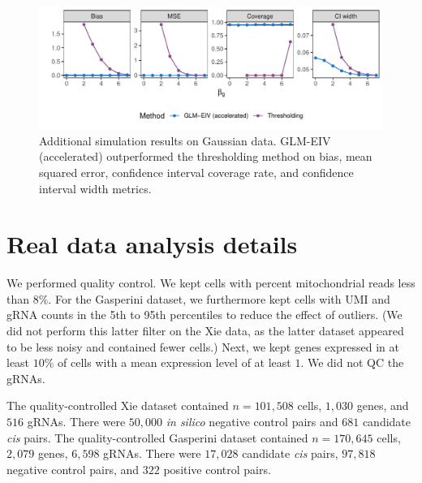 \documentclass[12pt]{article}
\begin{document}
\begin{appendices}
\begin{figure}
	\centering
	\includegraphics[width=1.0\linewidth]{../../figures/supplement_sim/gaussian}
	\caption{Additional simulation results on Gaussian data. GLM-EIV (accelerated) outperformed the thresholding method on bias, mean squared error, confidence interval coverage rate, and confidence interval width metrics.}\label{fig:gaussian_sim}
\end{figure}

\section{Real data analysis details}

We performed quality control. We kept cells with percent mitochondrial reads less than 8$\%$. For the Gasperini dataset, we furthermore kept cells with UMI and gRNA counts in the 5th to 95th percentiles to reduce the effect of outliers. (We did not perform this latter filter on the Xie data, as the latter dataset appeared to be less noisy and contained fewer cells.) Next, we kept genes expressed in at least $10\%$ of cells with a mean expression level of at least $1$. We did not QC the gRNAs.

The quality-controlled Xie dataset contained $n = 101,508$ cells, $1,030$ genes, and $516$ gRNAs. There were $50,000$ \textit{in silico} negative control pairs and $681$ candidate \textit{cis} pairs. The quality-controlled Gasperini dataset contained $n = 170,645$ cells, $2,079$ genes, $6,598$ gRNAs. There were $17,028$ candidate \textit{cis} pairs, $97,818$ negative control pairs, and $322$ positive control pairs.

\end{appendices}
\end{document}
